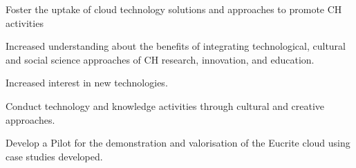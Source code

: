 \item Foster the uptake of cloud technology solutions and approaches to promote CH activities
\item Increased understanding about the benefits of integrating technological, cultural and social science approaches of CH research, innovation, and education.
\item Increased interest in new technologies.
\item Conduct technology and knowledge activities through cultural and creative approaches.
\item Develop a Pilot for the demonstration and valorisation of the Eucrite cloud using case studies developed.
